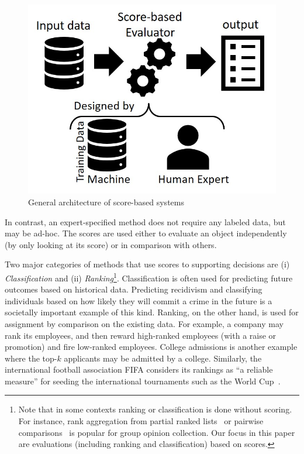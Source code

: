 \begin{figure}
    \begin{center}
    \includegraphics[width=\linewidth]{figs/ScoringArch.jpg}
    \end{center}
    \caption{General architecture of score-based systems}
    \label{fig:DSSArch}
\end{figure}

\noindent In contrast, an expert-specified method does not require any labeled data, but may be ad-hoc.
The scores are used either to evaluate an object independently (by only looking at its score) or in comparison with others. 

Two major categories of methods that use scores to supporting decisions are (i) {\em Classification} and (ii) {\em Ranking}\footnote{Note that in some contexts ranking or classification is done without scoring. For instance,
rank aggregation from partial ranked lists~\cite{marcus2011human} or pairwise comparisons~\cite{asudeh2015pareto} is popular for group opinion collection.  Our focus in this paper are evaluations (including ranking and classification) based on scores.
}.
Classification is often used for predicting future outcomes based on historical data.
Predicting recidivism and classifying individuals based on how likely they will commit a crime in the future is a societally important example of this kind.
Ranking, on the other hand, is used for assignment by comparison on the existing data.
For example, a company may rank its employees, and then reward high-ranked employees (with a raise or promotion) and fire low-ranked employees. College admissions is another example where the top-$k$ applicants may be admitted by a college.
Similarly, the international football association FIFA considers its rankings as ``a reliable measure'' for seeding the international tournaments such as the World Cup~\cite{fifa}.

